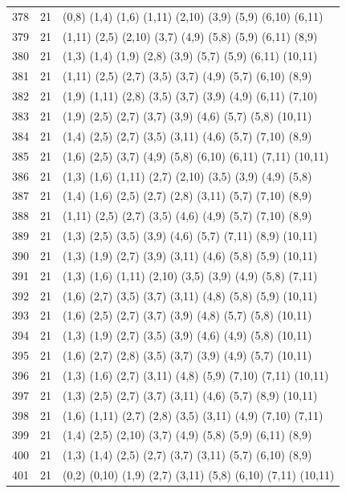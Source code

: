 {\begin{longtable}{lll}
378 & 21 & (0,8) (1,4) (1,6) (1,11) (2,10) (3,9) (5,9) (6,10) (6,11) \\
379 & 21 & (1,11) (2,5) (2,10) (3,7) (4,9) (5,8) (5,9) (6,11) (8,9) \\
380 & 21 & (1,3) (1,4) (1,9) (2,8) (3,9) (5,7) (5,9) (6,11) (10,11) \\
381 & 21 & (1,11) (2,5) (2,7) (3,5) (3,7) (4,9) (5,7) (6,10) (8,9) \\
382 & 21 & (1,9) (1,11) (2,8) (3,5) (3,7) (3,9) (4,9) (6,11) (7,10) \\
383 & 21 & (1,9) (2,5) (2,7) (3,7) (3,9) (4,6) (5,7) (5,8) (10,11) \\
384 & 21 & (1,4) (2,5) (2,7) (3,5) (3,11) (4,6) (5,7) (7,10) (8,9) \\
385 & 21 & (1,6) (2,5) (3,7) (4,9) (5,8) (6,10) (6,11) (7,11) (10,11) \\
386 & 21 & (1,3) (1,6) (1,11) (2,7) (2,10) (3,5) (3,9) (4,9) (5,8) \\
387 & 21 & (1,4) (1,6) (2,5) (2,7) (2,8) (3,11) (5,7) (7,10) (8,9) \\
388 & 21 & (1,11) (2,5) (2,7) (3,5) (4,6) (4,9) (5,7) (7,10) (8,9) \\
389 & 21 & (1,3) (2,5) (3,5) (3,9) (4,6) (5,7) (7,11) (8,9) (10,11) \\
390 & 21 & (1,3) (1,9) (2,7) (3,9) (3,11) (4,6) (5,8) (5,9) (10,11) \\
391 & 21 & (1,3) (1,6) (1,11) (2,10) (3,5) (3,9) (4,9) (5,8) (7,11) \\
392 & 21 & (1,6) (2,7) (3,5) (3,7) (3,11) (4,8) (5,8) (5,9) (10,11) \\
393 & 21 & (1,6) (2,5) (2,7) (3,7) (3,9) (4,8) (5,7) (5,8) (10,11) \\
394 & 21 & (1,3) (1,9) (2,7) (3,5) (3,9) (4,6) (4,9) (5,8) (10,11) \\
395 & 21 & (1,6) (2,7) (2,8) (3,5) (3,7) (3,9) (4,9) (5,7) (10,11) \\
396 & 21 & (1,3) (1,6) (2,7) (3,11) (4,8) (5,9) (7,10) (7,11) (10,11) \\
397 & 21 & (1,3) (2,5) (2,7) (3,7) (3,11) (4,6) (5,7) (8,9) (10,11) \\
398 & 21 & (1,6) (1,11) (2,7) (2,8) (3,5) (3,11) (4,9) (7,10) (7,11) \\
399 & 21 & (1,4) (2,5) (2,10) (3,7) (4,9) (5,8) (5,9) (6,11) (8,9) \\
400 & 21 & (1,3) (1,4) (2,5) (2,7) (3,7) (3,11) (5,7) (6,10) (8,9) \\
401 & 21 & (0,2) (0,10) (1,9) (2,7) (3,11) (5,8) (6,10) (7,11) (10,11) \\

\end{longtable}}
